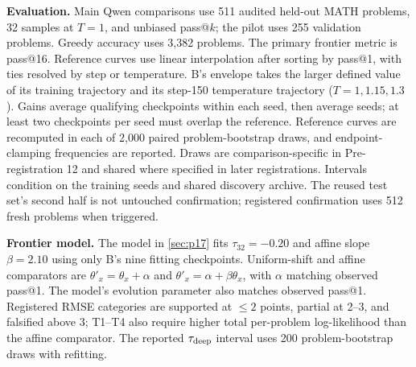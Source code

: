 \documentclass[11pt]{article}
\begin{document}
\textbf{Evaluation.} Main Qwen comparisons use 511 audited held-out MATH problems, 32 samples at $T=1$, and unbiased pass@$k$; the pilot uses 255 validation problems. Greedy accuracy uses 3,382 problems. The primary frontier metric is pass@16. Reference curves use linear interpolation after sorting by pass@1, with ties resolved by step or temperature. B's envelope takes the larger defined value of its training trajectory and its step-150 temperature trajectory ($T=1,1.15,1.3$). Gains average qualifying checkpoints within each seed, then average seeds; at least two checkpoints per seed must overlap the reference. Reference curves are recomputed in each of 2,000 paired problem-bootstrap draws, and endpoint-clamping frequencies are reported. Draws are comparison-specific in Pre-registration 12 and shared where specified in later registrations. Intervals condition on the training seeds and shared discovery archive. The reused test set's second half is not untouched confirmation; registered confirmation uses 512 fresh problems when triggered.

\textbf{Frontier model.} The model in \cref{sec:p17} fits $\tau_{32}=-0.20$ and affine slope $\beta=2.10$ using only B's nine fitting checkpoints. Uniform-shift and affine comparators are $\theta'_x=\theta_x+\alpha$ and $\theta'_x=\alpha+\beta\theta_x$, with $\alpha$ matching observed pass@1. The model's evolution parameter also matches observed pass@1. Registered RMSE categories are supported at $\le2$ points, partial at 2--3, and falsified above 3; T1--T4 also require higher total per-problem log-likelihood than the affine comparator. The reported $\tau_{\rm deep}$ interval uses 200 problem-bootstrap draws with refitting.
\end{document}

